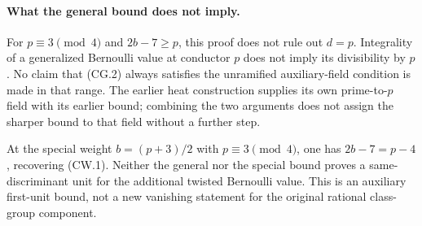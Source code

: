 \paragraph{What the general bound does not imply.}
For $p\equiv3\pmod4$ and $2b-7\geq p$, this proof
does not rule out $d=p$.  Integrality of a generalized
Bernoulli value at conductor $p$ does not imply its
divisibility by $p$.  No claim that (CG.2) always satisfies
the unramified auxiliary-field condition is made in that
range.  The earlier heat construction supplies its own
prime-to-$p$ field with its earlier bound; combining the
two arguments does not assign the sharper bound to that
field without a further step.

At the special weight $b=(p+3)/2$ with $p\equiv3\pmod4$,
one has $2b-7=p-4$, recovering (CW.1).
Neither the general nor the special bound proves a
same-discriminant unit for the additional twisted
Bernoulli value.  This is an auxiliary first-unit bound,
not a new vanishing statement for the original rational
class-group component.
